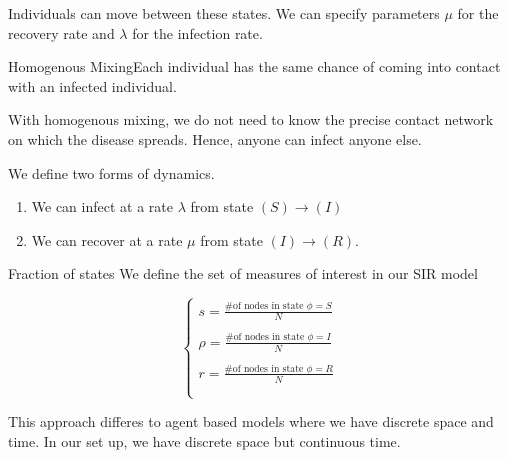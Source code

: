 \documentclass[twoside]{article}
\begin{document}
Individuals can move between these states. We can specify parameters $\mu$ for the recovery rate and $\lambda$ for the infection rate.

\begin{definition_exam}{Homogenous Mixing}{}Each individual has the same chance of coming into contact with an infected individual. 
\end{definition_exam}

With homogenous mixing, we do not need to know the precise contact network on which the disease spreads. Hence, anyone can infect anyone else. 

We define two forms of dynamics.

\begin{enumerate}
\item We can infect at a rate $\lambda$ from state $(S) \rightarrow (I)$
\item We can recover at a rate $\mu$ from state $(I) \rightarrow (R).$
\end{enumerate}

\begin{definition_exam}{Fraction of states}{} We define the set of measures of interest in our SIR model

$$
\begin{cases}
s = \frac{\text{\# of nodes in state }\phi = S}{N}\\\\
\rho = \frac{\text{\# of nodes in state }\phi = I}{N}\\\\
r = \frac{\text{\# of nodes in state }\phi = R}{N}\\\\
\end{cases}
$$
\end{definition_exam}

This approach differes to agent based models where we have discrete space and time. In our set up, we have discrete space but continuous time.
\end{document}
